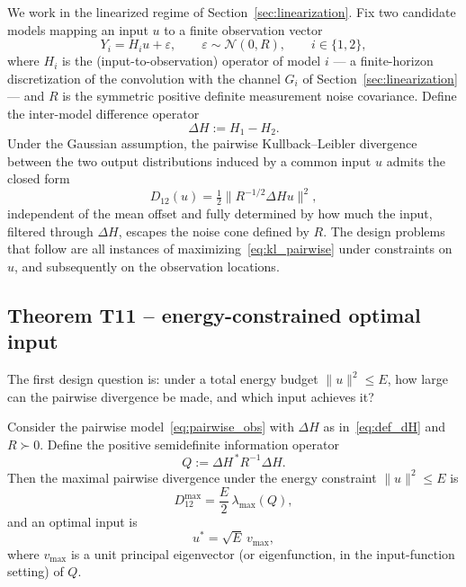 We work in the linearized regime of Section~\ref{sec:linearization}. Fix two candidate models mapping an input \(u\) to a finite observation vector
\begin{equation}
Y_i = H_i u + \varepsilon,
\qquad \varepsilon \sim \mathcal{N}(0, R),
\qquad i \in \{1, 2\},
\label{eq:pairwise_obs}
\end{equation}
where \(H_i\) is the (input-to-observation) operator of model \(i\) --- a finite-horizon discretization of the convolution with the channel \(G_i\) of Section~\ref{sec:linearization} --- and \(R\) is the symmetric positive definite measurement noise covariance. Define the inter-model difference operator
\begin{equation}
\Delta H := H_1 - H_2.
\label{eq:def_dH}
\end{equation}
Under the Gaussian assumption, the pairwise Kullback--Leibler divergence between the two output distributions induced by a common input \(u\) admits the closed form
\begin{equation}
D_{12}(u) = \tfrac{1}{2} \| R^{-1/2} \Delta H u \|^2,
\label{eq:kl_pairwise}
\end{equation}
independent of the mean offset and fully determined by how much the input, filtered through \(\Delta H\), escapes the noise cone defined by \(R\). The design problems that follow are all instances of maximizing~\eqref{eq:kl_pairwise} under constraints on \(u\), and subsequently on the observation locations.

\subsection{Theorem T11 -- energy-constrained optimal input}

The first design question is: under a total energy budget \(\|u\|^2 \le E\), how large can the pairwise divergence be made, and which input achieves it?

\begin{theorem}
\label{thm:T11}
Consider the pairwise model~\eqref{eq:pairwise_obs} with \(\Delta H\) as in~\eqref{eq:def_dH} and \(R \succ 0\). Define the positive semidefinite information operator
\begin{equation}
Q := \Delta H^{\,*} R^{-1} \Delta H.
\label{eq:def_Q}
\end{equation}
Then the maximal pairwise divergence under the energy constraint \(\|u\|^2 \le E\) is
\begin{equation}
\boxed{
D_{12}^{\max} = \frac{E}{2}\, \lambda_{\max}(Q),
}
\label{eq:T11_max}
\end{equation}
and an optimal input is
\begin{equation}
\boxed{
u^{*} = \sqrt{E}\, v_{\max},
}
\label{eq:T11_input}
\end{equation}
where \(v_{\max}\) is a unit principal eigenvector (or eigenfunction, in the input-function setting) of \(Q\).
\end{theorem}


